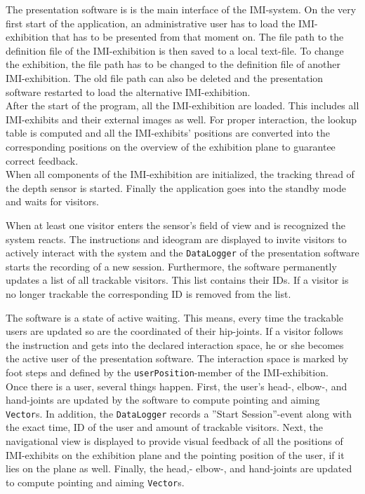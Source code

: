 The presentation software is is the main interface of the \ac{IMI}-system. On the very first start of the application, an administrative user has to load the \ac{IMI}-exhibition that has to be presented from that moment on. The file path to the definition file of the \ac{IMI}-exhibition is then saved to a local text-file. To change the exhibition, the file path has to be changed to the definition file of another \ac{IMI}-exhibition. The old file path can also be deleted and the presentation software restarted to load the alternative \ac{IMI}-exhibition.
\\
After the start of the program, all the \ac{IMI}-exhibition are loaded. This includes all \ac{IMI}-exhibits and their external images as well. For proper interaction, the lookup table is computed and all the \ac{IMI}-exhibits' positions are converted into the corresponding positions on the overview of the exhibition plane to guarantee correct feedback.
\\
When all components of the \ac{IMI}-exhibition are initialized, the tracking thread of the depth sensor is started. Finally the application goes into the standby mode and waits for visitors. 

When at least one visitor enters the sensor's field of view and is recognized the system reacts. The instructions and ideogram are displayed to invite visitors to actively interact with the system and the \texttt{DataLogger} of the presentation software starts the recording of a new session. Furthermore, the software permanently updates a list of all trackable visitors. This list contains their \ac{ID}s. If a visitor is no longer trackable the corresponding \ac{ID} is removed from the list. 

The software is a state of active waiting. This means, every time the trackable users are updated so are the coordinated of their hip-joints. If a visitor follows the instruction and gets into the declared interaction space, he or she becomes the active user of the presentation software. The interaction space is marked by foot steps and defined by the \texttt{userPosition}-member of the \ac{IMI}-exhibition.
\\
Once there is a user, several things happen. First, the user's head-, elbow-, and hand-joints are updated by the software to compute pointing and aiming \texttt{Vector}s. In addition, the \texttt{DataLogger} records a ''Start Session''-event along with the exact time, ID of the user and amount of trackable visitors. Next, the navigational view is displayed to provide visual feedback of all the positions of \ac{IMI}-exhibits on the exhibition plane and the pointing position of the user, if it lies on the plane as well. Finally, the head,- elbow-, and hand-joints are updated to compute pointing and aiming \texttt{Vector}s.

